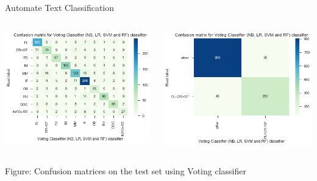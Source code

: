 \documentclass[handout,t,usenames,dvipsnames]{beamer}
\begin{document}
\begin{frame}{Automate Text Classification}


\begin{columns}
\begin{column}{0.5\textwidth}
    \begin{center}
     \includegraphics[width=1\textwidth]{matrix_10.png}
     \end{center}
\end{column}
\begin{column}{0.5\textwidth}  %
    \begin{center}
     \includegraphics[width=1\textwidth]{matrix_2.png}
     \end{center}
\end{column}
\end{columns}

\centering
{\color{emap-azul-escuro}\small Figure:} \small Confusion matrices on the test set using Voting classifier
\end{frame}
\end{document}
